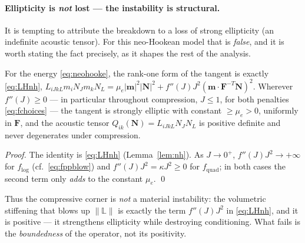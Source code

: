 \paragraph{Ellipticity is \emph{not} lost --- the instability is structural.} It is tempting to attribute the breakdown to a loss of strong ellipticity (an
indefinite acoustic tensor). For this neo-Hookean model that is \emph{false}, and it is worth stating the fact
precisely, as it shapes the rest of the analysis.

\begin{lemma}
    \label{lem:SEcompress}
    For the energy \eqref{eq:neohooke}, the rank-one form of the tangent is exactly \eqref{eq:LHnh},
    $L_{iJkL}m_iN_Jm_kN_L=\mu_e|\bm{m}|^2|\bm{N}|^2+f''(J)J^2(\bm{m}\cdot\bm{F}^{-T}\bm{N})^2$. Wherever $f''(J)\ge0$ ---
    in particular throughout compression, $J\le1$, for both penalties \eqref{eq:fchoices} --- the tangent is strongly
    elliptic with constant $\ge\mu_e>0$, uniformly in $\bm{F}$, and the acoustic tensor $Q_{ik}(\bm{N})=L_{iJkL}N_JN_L$
    is positive definite and never degenerates under compression.
\end{lemma}

\begin{proof}
    The identity is \eqref{eq:LHnh} (Lemma~\ref{lem:nh}). As $J\to0^+$, $f''(J)J^2\to+\infty$ for $f_{\log}$
    (cf.~\eqref{eq:fppblow}) and $f''(J)J^2=\kappa J^2\ge0$ for $f_{\mathrm{quad}}$; in both cases the second term only
    \emph{adds} to the constant $\mu_e$. \qed
\end{proof}

Thus the compressive corner is \emph{not} a material instability: the volumetric stiffening that blows up
$\|\mathbb{L}\|$ is exactly the term $f''(J)J^2$ in \eqref{eq:LHnh}, and it is positive --- it strengthens ellipticity
while destroying conditioning. What fails is the \emph{boundedness} of the operator, not its positivity.

